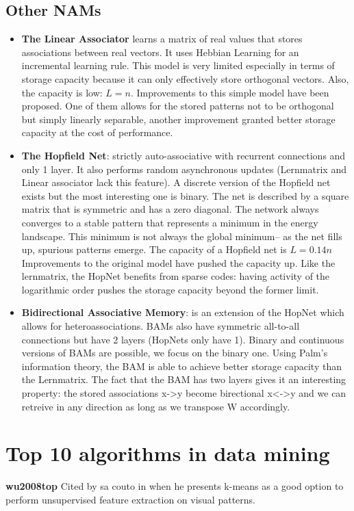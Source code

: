 \documentclass{article}
\begin{document}
\subsection{Other NAMs}
\begin{itemize}
\item \textbf{The Linear Associator} learns a matrix of real values that stores associations between real vectors. It uses Hebbian Learning for an incremental learning rule. This model is very limited especially in terms of storage capacity because it can only effectively store orthogonal vectors. Also, the capacity is low: $L=n$. Improvements to this simple model have been proposed. One of them allows for the stored patterns not to be orthogonal but simply linearly separable, another improvement granted better storage capacity at the cost of performance.
\item \textbf{The Hopfield Net}: strictly auto-associative with recurrent connections and only 1 layer. It also performs random asynchronous updates (Lernmatrix and Linear associator lack this feature). A discrete version of the Hopfield net exists but the most interesting one is binary. The net is described by a square matrix that is symmetric and has a zero diagonal. The network always converges to a stable pattern that represents a minimum in the energy landscape. This minimum is not always the global minimum-- as the net fills up, spurious patterns emerge. The capacity of a Hopfield net is $L=0.14n$ Improvements to the original model have pushed the capacity up. Like the lernmatrix, the HopNet benefits from sparse codes: having activity of the logarithmic order pushes the storage capacity beyond the former limit.
\item \textbf{Bidirectional Associative Memory}: is an extension of the HopNet which allows for heteroassociations. BAMs also have symmetric all-to-all connections but have 2 layers (HopNets only have 1). Binary and continuous versions of BAMs are possible, we focus on the binary one. Using Palm's information theory, the BAM is able to achieve better storage capacity than the Lernmatrix. The fact that the BAM has two layers gives it an interesting property: the stored associations x->y become birectional x<->y and we can retreive in any direction as long as we transpose W accordingly. 
\end{itemize}

\section{Top 10 algorithms in data mining}
\textbf{wu2008top} \cite{wu2008top}\newline
Cited by sa couto in \cite{sa2020storing} when he presents k-means as a good option to perform unsupervised feature extraction on visual patterns.  
\end{document}
